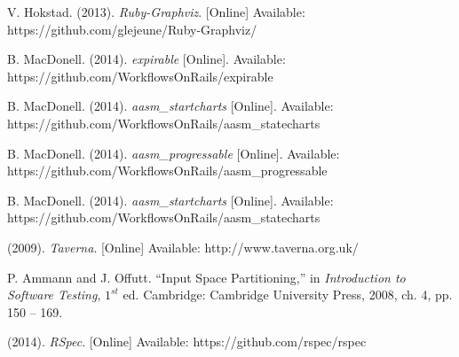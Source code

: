 \begin{thebibliography}{99}
V. Hokstad. (2013). \textit{Ruby-Graphviz}. [Online] Available: https://github.com/glejeune/Ruby-Graphviz/

B. MacDonell. (2014). \textit{expirable} [Online]. Available: https://github.com/WorkflowsOnRails/expirable

B. MacDonell. (2014). \textit{aasm\_startcharts} [Online]. Available: https://github.com/WorkflowsOnRails/aasm\_statecharts

B. MacDonell. (2014). \textit{aasm\_progressable} [Online]. Available: https://github.com/WorkflowsOnRails/aasm\_progressable

B. MacDonell. (2014). \textit{aasm\_startcharts} [Online]. Available: https://github.com/WorkflowsOnRails/aasm\_statecharts

(2009). \textit{Taverna}. [Online] Available: http://www.taverna.org.uk/

P. Ammann and J. Offutt. ``Input Space Partitioning,'' in \textit{Introduction to Software Testing}, $1^{st}$ ed. Cambridge: Cambridge University Press, 2008, ch. 4, pp. 150 -- 169.

(2014). \textit{RSpec}. [Online] Available: https://github.com/rspec/rspec


\end{thebibliography}

%    
%    

